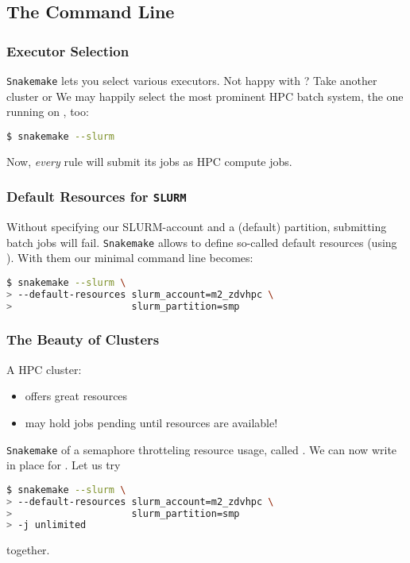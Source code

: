 \subsection{The Command Line}

\begin{frame}[fragile]
  \frametitle{Executor Selection}
  \texttt{Snakemake} lets you select various executors. Not happy with \mogon? Take another cluster or  \newline
  We may happily select the most prominent HPC batch system, the one running on \mogon, too:
  \begin{lstlisting}[language=Bash, style=Shell]
$ snakemake --slurm
  \end{lstlisting}
  Now, \emph{every} rule will submit its jobs as HPC compute jobs.
\end{frame}

\begin{frame}[fragile]
  \frametitle{Default Resources for \texttt{SLURM}}
  Without specifying our SLURM-account and a (default) partition, submitting batch jobs will fail. \texttt{Snakemake} allows to define so-called default resources (using ). With them our minimal command line becomes:
  \begin{lstlisting}[language=Bash, style=Shell, breaklines=true]
$ snakemake --slurm \
> --default-resources slurm_account=m2_zdvhpc \
>                     slurm_partition=smp
  \end{lstlisting}
\end{frame}

\begin{frame}[fragile]
  \frametitle{The Beauty of Clusters}
  A HPC cluster:
  \begin{itemize}
   \item offers great resources
   \item may hold jobs pending until resources are available!
  \end{itemize}
  \pause
  \texttt{Snakemake} of a semaphore throtteling resource usage, called . We can now write  in place for . Let us try
  \begin{lstlisting}[language=Bash, style=Shell, breaklines=true]
$ snakemake --slurm \
> --default-resources slurm_account=m2_zdvhpc \
>                     slurm_partition=smp
> -j unlimited
  \end{lstlisting}
  together.
\end{frame}

